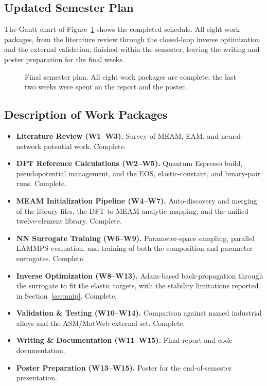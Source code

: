 \subsection{Updated Semester Plan}

The Gantt chart of Figure~\ref{fig:gantt} shows the completed schedule. All
eight work packages, from the literature review through the closed-loop
inverse optimization and the external validation, finished within the
semester, leaving the writing and poster preparation for the final weeks.

\begin{figure}[htbp]
	\centering
	\begin{semestergantt}
	\end{semestergantt}
	\caption{Final semester plan. All eight work packages are complete; the
	last two weeks were spent on the report and the poster.}
	\label{fig:gantt}
\end{figure}

\subsection{Description of Work Packages}
\begin{itemize}
	\item \textbf{Literature Review (W1--W3).} Survey of MEAM, EAM, and
	      neural-network potential work. Complete.
	\item \textbf{DFT Reference Calculations (W2--W5).} Quantum Espresso build,
	      pseudopotential management, and the EOS, elastic-constant, and
	      binary-pair runs. Complete.
	\item \textbf{MEAM Initialization Pipeline (W4--W7).} Auto-discovery and
	      merging of the library files, the DFT-to-MEAM analytic mapping, and
	      the unified twelve-element library. Complete.
	\item \textbf{NN Surrogate Training (W6--W9).} Parameter-space sampling,
	      parallel LAMMPS evaluation, and training of both the composition and
	      parameter surrogates. Complete.
	\item \textbf{Inverse Optimization (W8--W13).} Adam-based back-propagation
	      through the surrogate to fit the elastic targets, with the stability
	      limitations reported in Section~\ref{sec:nnip}. Complete.
	\item \textbf{Validation \& Testing (W10--W14).} Comparison against named
	      industrial alloys and the ASM/MatWeb external set. Complete.
	\item \textbf{Writing \& Documentation (W11--W15).} Final report and code
	      documentation.
	\item \textbf{Poster Preparation (W13--W15).} Poster for the
	      end-of-semester presentation.
\end{itemize}

